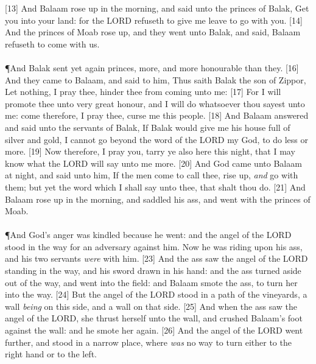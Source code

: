 [13] \textcolor[cmyk]{0.99998,1,0,0}{And Balaam rose up in the morning, and said unto the princes of Balak, Get you into your land: for the LORD refuseth to give me leave to go with you.}
[14] \textcolor[cmyk]{0.99998,1,0,0}{And the princes of Moab rose up, and they went unto Balak, and said, Balaam refuseth to come with us.}\\
\\
\P \textcolor[cmyk]{0.99998,1,0,0}{And Balak sent yet again princes, more, and more honourable than they.}
[16] \textcolor[cmyk]{0.99998,1,0,0}{And they came to Balaam, and said to him, Thus saith Balak the son of Zippor, Let nothing, I pray thee, hinder thee from coming unto me:}
[17] \textcolor[cmyk]{0.99998,1,0,0}{For I will promote thee unto very great honour, and I will do whatsoever thou sayest unto me: come therefore, I pray thee, curse me this people.}
[18] \textcolor[cmyk]{0.99998,1,0,0}{And Balaam answered and said unto the servants of Balak, If Balak would give me his house full of silver and gold, I cannot go beyond the word of the LORD my God, to do less or more.}
[19] \textcolor[cmyk]{0.99998,1,0,0}{Now therefore, I pray you, tarry ye also here this night, that I may know what the LORD will say unto me more.}
[20] \textcolor[cmyk]{0.99998,1,0,0}{And God came unto Balaam at night, and said unto him, If the men come to call thee, rise up, \emph{and} go with them; but yet the word which I shall say unto thee, that shalt thou do.}
[21] \textcolor[cmyk]{0.99998,1,0,0}{And Balaam rose up in the morning, and saddled his ass, and went with the princes of Moab.}\\
\\
\P  \textcolor[cmyk]{0.99998,1,0,0}{And God's anger was kindled because he went: and the angel of the LORD stood in the way for an adversary against him. Now he was riding upon his ass, and his two servants \emph{were} with him.}
[23] \textcolor[cmyk]{0.99998,1,0,0}{And the ass saw the angel of the LORD standing in the way, and his sword drawn in his hand: and the ass turned aside out of the way, and went into the field: and Balaam smote the ass, to turn her into the way.}
[24] \textcolor[cmyk]{0.99998,1,0,0}{But the angel of the LORD stood in a path of the vineyards, a wall \emph{being} on this side, and a wall on that side.}
[25] \textcolor[cmyk]{0.99998,1,0,0}{And when the ass saw the angel of the LORD, she thrust herself unto the wall, and crushed Balaam's foot against the wall: and he smote her again.}
[26] \textcolor[cmyk]{0.99998,1,0,0}{And the angel of the LORD went further, and stood in a narrow place, where \emph{was} no way to turn either to the right hand or to the left.}
